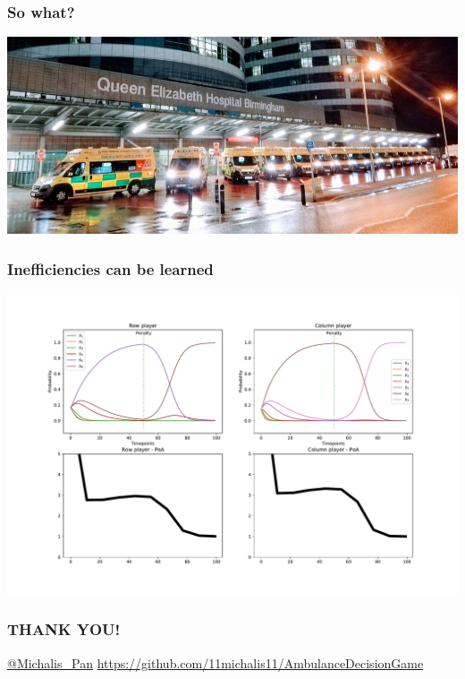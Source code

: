 \begin{frame}
    \frametitle{So what?}

    \centering
    \includegraphics[scale=0.45]{Bin/ambulance_queue.jpg}

\end{frame}


\begin{frame}
    \frametitle{Inefficiencies can be learned}
    \centering

    \includegraphics[scale=0.28]{Bin/penalised_game.pdf}

\end{frame}


\begin{frame}
    \frametitle{THANK YOU!}
    \centering
    \color{orange}

    
    
    \vspace{0.5cm}

    \url{@Michalis_Pan}
    \url{https://github.com/11michalis11/AmbulanceDecisionGame}
    

\end{frame}